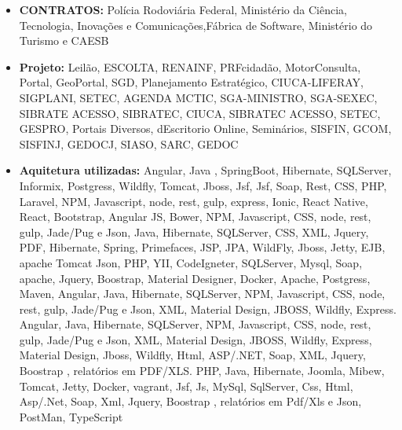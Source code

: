 \documentclass[10pt,a4paper]{altacv}
\begin{document}
\begin{itemize}
\item \textbf{CONTRATOS:} Polícia Rodoviária Federal, Ministério da Ciência, Tecnologia, Inovações e Comunicações,Fábrica de Software, Ministério do Turismo e CAESB
\item \textbf{Projeto:} Leilão, ESCOLTA, RENAINF, PRFcidadão, MotorConsulta, Portal, GeoPortal, SGD, Planejamento Estratégico, CIUCA-LIFERAY, SIGPLANI, SETEC, AGENDA MCTIC, SGA-MINISTRO, SGA-SEXEC, SIBRATE ACESSO, SIBRATEC, CIUCA, SIBRATEC ACESSO, SETEC, GESPRO, Portais Diversos, dEscritorio Online, Seminários, SISFIN, GCOM, SISFINJ, GEDOCJ, SIASO, SARC, GEDOC
\item \textbf{Aquitetura utilizadas: }Angular, Java , SpringBoot, Hibernate, SQLServer, Informix, Postgress, Wildfly, Tomcat, Jboss, Jsf, Jsf, Soap, Rest, CSS, PHP, Laravel, NPM, Javascript, node, rest, gulp, express, Ionic, React Native, React, Bootstrap, Angular JS, Bower, NPM, Javascript, CSS, node, rest, gulp, Jade/Pug e Json, Java, Hibernate, SQLServer, CSS, XML, Jquery, PDF, Hibernate, Spring, Primefaces, JSP, JPA, WildFly, Jboss, Jetty, EJB, apache Tomcat Json, PHP,  YII, CodeIgneter, SQLServer,  Mysql, Soap, apache, Jquery, Boostrap, Material Designer, Docker, Apache, Postgress, Maven,
Angular, Java, Hibernate, SQLServer,  NPM, Javascript, CSS, node, rest, gulp, Jade/Pug e Json, XML, Material Design, JBOSS, Wildfly, Express. Angular, Java, Hibernate, SQLServer,  NPM, Javascript, CSS, node, rest, gulp, Jade/Pug e Json, XML, Material Design, JBOSS, Wildfly, Express, Material Design, Jboss, Wildfly, Html, ASP/.NET, Soap, XML, Jquery, Boostrap , relatórios em PDF/XLS.
PHP, Java, Hibernate, Joomla, Mibew, Tomcat, Jetty, Docker, vagrant, Jsf, Js, MySql, SqlServer, Css, Html, Asp/.Net, Soap, Xml, Jquery, Boostrap , relatórios em Pdf/Xls e Json, PostMan, TypeScript
\end{itemize}

\end{document}
